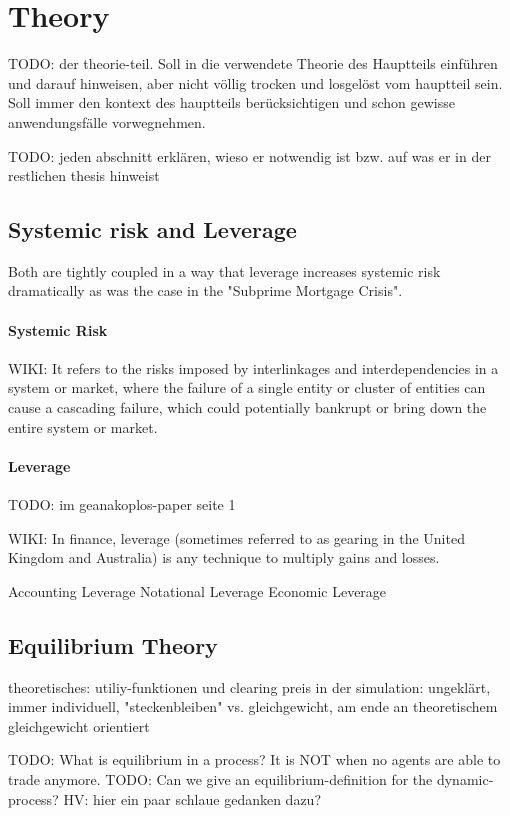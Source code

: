 \documentclass[../Bachelorarbeit.tex]{subfiles}
\begin{document}
\chapter{Theory}
\label{ch:theory}

TODO: der theorie-teil. Soll in die verwendete Theorie des Hauptteils einführen und darauf hinweisen, aber nicht völlig trocken und losgelöst vom hauptteil sein. Soll immer den kontext des hauptteils berücksichtigen und schon gewisse anwendungsfälle vorwegnehmen.

TODO: jeden abschnitt erklären, wieso er notwendig ist bzw. auf was er in der restlichen thesis hinweist 

\section{Systemic risk and Leverage}
Both are tightly coupled in a way that leverage increases systemic risk dramatically as was the case in the "Subprime Mortgage Crisis".

\subsubsection{Systemic Risk}
WIKI: It refers to the risks imposed by interlinkages and interdependencies in a system or market, where the failure of a single entity or cluster of entities can cause a cascading failure, which could potentially bankrupt or bring down the entire system or market.

\cite{Milan2010}

\subsubsection{Leverage}
TODO: im geanakoplos-paper seite 1

WIKI: In finance, leverage (sometimes referred to as gearing in the United Kingdom and Australia) is any technique to multiply gains and losses.

Accounting Leverage
Notational Leverage
Economic Leverage

\section{Equilibrium Theory}	
		theoretisches: utiliy-funktionen und clearing preis
		in der simulation: ungeklärt, immer individuell, "steckenbleiben" vs. gleichgewicht, am ende an theoretischem gleichgewicht orientiert

TODO: What is equilibrium in a process? It is NOT when no agents are able to trade anymore.
TODO: Can we give an equilibrium-definition for the dynamic-process? HV: hier ein paar schlaue gedanken dazu?
\end{document}
